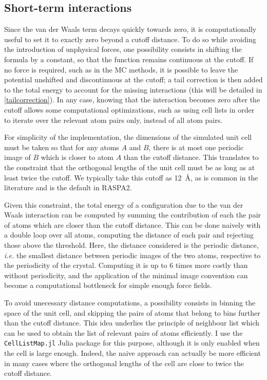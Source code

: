 \documentclass[main.tex]{subfiles}
\begin{document}
\subsection{Short-term interactions}

Since the van der Waals term decays quickly towards zero, it is computationally useful to set it to exactly zero beyond a cutoff distance. To do so while avoiding the introduction of unphysical forces, one possibility consists in shifting the formula by a constant, so that the function remains continuous at the cutoff. If no force is required, such as in the MC methods, it is possible to leave the potential unshifted and discontinuous at the cutoff; a tail correction is then added to the total energy to account for the missing interactions (this will be detailed in \cref{tailcorrection}). In any case, knowing that the interaction becomes zero after the cutoff allows some computational optimizations, such as using cell lists in order to iterate over the relevant atom pairs only, instead of all atom pairs.

For simplicity of the implementation, the dimensions of the simulated unit cell must be taken so that for any atoms $A$ and $B$, there is at most one periodic image of $B$ which is closer to atom $A$ than the cutoff distance. This translates to the constraint that the orthogonal lengths of the unit cell must be as long as at least twice the cutoff. We typically take this cutoff as \qty{12}{\angstrom}, as is common in the literature and is the default in RASPA2.

Given this constraint, the total energy of a configuration due to the van der Waals interaction can be computed by summing the contribution of each the pair of atoms which are closer than the cutoff distance. This can be done naively with a double loop over all atoms, computing the distance of each pair and rejecting those above the threshold. Here, the distance considered is the periodic distance, \textit{i.e.} the smallest distance between periodic images of the two atoms, respective to the periodicity of the crystal. Computing it is up to 6 times more costly than without periodicity, and the application of the minimal image convention can become a computational bottleneck for simple enough force fields.

To avoid unecessary distance computations, a possibility consists in binning the space of the unit cell, and skipping the pairs of atoms that belong to bins further than the cutoff distance. This idea underlies the principle of neighbour list which can be used to obtain the list of relevant pairs of atoms efficiently. I use the \texttt{CellListMap.jl}\autocite{CellListMap} Julia package for this purpose, although it is only enabled when the cell is large enough. Indeed, the naive approach can actually be more efficient in many cases where the orthogonal lengths of the cell are close to twice the cutoff distance.
\end{document}
